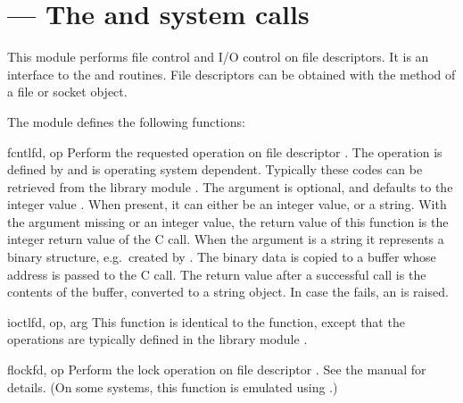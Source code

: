 \section{ ---
         The  and  system calls}



This module performs file control and I/O control on file descriptors.
It is an interface to the  and 
\UNIX{} routines.  File descriptors can be obtained with the
 method of a file or socket object.

The module defines the following functions:


\begin{funcdesc}{fcntl}{fd, op}
  Perform the requested operation on file descriptor .
  The operation is defined by  and is operating system
  dependent.  Typically these codes can be retrieved from the library
  module . The argument 
  is optional, and defaults to the integer value .  When
  present, it can either be an integer value, or a string.  With
  the argument missing or an integer value, the return value of this
  function is the integer return value of the C 
  call.  When the argument is a string it represents a binary
  structure, e.g.\ created by . The binary
  data is copied to a buffer whose address is passed to the C
   call.  The return value after a successful call
  is the contents of the buffer, converted to a string object.  In
  case the  fails, an  is
  raised.
\end{funcdesc}

\begin{funcdesc}{ioctl}{fd, op, arg}
  This function is identical to the  function, except
  that the operations are typically defined in the library module
  .
\end{funcdesc}

\begin{funcdesc}{flock}{fd, op}
Perform the lock operation  on file descriptor .
See the \UNIX{} manual  for details.  (On some
systems, this function is emulated using .)
\end{funcdesc}

